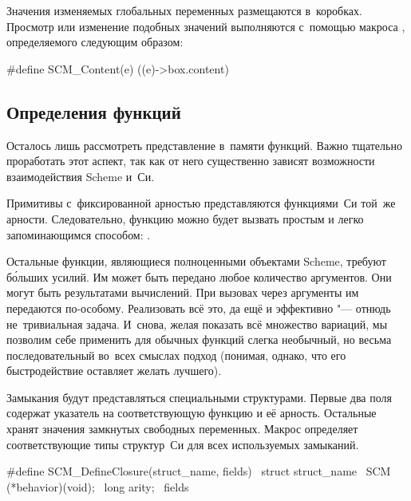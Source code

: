Значения изменяемых глобальных переменных размещаются в~коробках. Просмотр или
изменение подобных значений выполняются с~помощью макроса ,
определяемого следующим образом:

\begin{code:c}
#define SCM_Content(e) ((e)->box.content)
\end{code:c}


\subsection{Определения функций}\label{cc/data/ssect:func}

Осталось лишь рассмотреть представление в~памяти функций. Важно тщательно
проработать этот аспект, так как от него существенно зависят возможности
взаимодействия Scheme и~Си.

Примитивы с~фиксированной арностью представляются функциями~Си той~же арности.
Следовательно, функцию  можно будет вызвать простым и легко
запоминающимся способом: .

Остальные функции, являющиеся полноценными объектами Scheme, требуют б\'{о}льших
усилий. Им может быть передано любое количество аргументов. Они могут быть
результатами вычислений. При вызовах через  аргументы им передаются
по-особому. Реализовать всё это, да ещё и эффективно "--- отнюдь не~тривиальная
задача. И~снова, желая показать всё множество вариаций, мы позволим себе
применить для обычных функций слегка необычный, но весьма последовательный
во~всех смыслах подход (понимая, однако, что его быстродействие оставляет желать
лучшего). 

Замыкания будут представляться специальными структурами. Первые два поля
содержат указатель на соответствующую функцию и её арность. Остальные хранят
значения замкнутых свободных переменных. Макрос 
определяет соответствующие типы структур~Си для всех используемых замыканий.

\begin{code:c}
#define SCM_DefineClosure(struct_name, fields) \
  struct struct_name {                         \
      SCM (*behavior)(void);                   \
      long arity;                              \
      fields                                   \
  }
\end{code:c}

